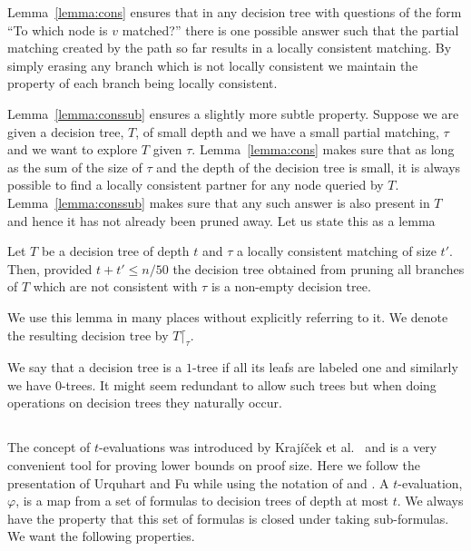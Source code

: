 \documentclass{theoretics}
\begin{document}
Lemma~\ref{lemma:cons} ensures that in any decision tree with questions of
the form ``To which node is $v$ matched?'' there is one
possible answer such that the partial matching created
by the path so far results in a locally consistent matching.
By simply erasing any branch which is not locally consistent
we maintain the property of each branch being
locally consistent.   

Lemma~\ref{lemma:conssub} ensures a slightly more subtle property.
Suppose we are given a decision tree, $T$,  of small depth and we have
a small partial matching, $\tau$ and we want to explore $T$ given
$\tau$.   Lemma~\ref{lemma:cons} makes sure that as long
as the sum of the size of $\tau$ and the depth of the decision
tree is small, it is always possible to find a locally
consistent partner for any node
queried by $T$.  Lemma~\ref{lemma:conssub} makes sure that 
any such answer is also present in $T$ and hence it has not
already been pruned away.  Let us state this as a lemma

\begin{lemma}\label{lemma:extend}
Let $T$ be a decision tree of depth $t$ and $\tau$
a locally consistent matching of size $t'$.
Then, provided $t+t' \leq n/50$ the
decision tree obtained from pruning all branches
of $T$ which are not consistent with $\tau$
is a non-empty decision tree.
\end{lemma}

We use this lemma in many places without explicitly referring
to it.  We denote the resulting decision tree by $T \lceil_{\tau}$.

We say that a decision tree is a $1$-tree if all its
leafs are labeled one and similarly we have $0$-trees.
It might seem redundant to allow such trees but 
when doing operations on decision trees they naturally occur.

\subsection{}

The concept of $t$-evaluations was introduced by Krajíček et al.\
\cite{KPW95FregePHPExp} and is a very convenient tool for proving
lower bounds on proof size. Here we follow the presentation of Urquhart and Fu
\cite{uf} while using the notation of 
\cite{jhtseitin} and \cite{jhkr}.
A $t$-evaluation, $\varphi$, is a map from a set of formulas to decision 
trees of depth at most $t$.  We always have the property that this
set of formulas is closed under taking sub-formulas.
We want the following properties.
\end{document}
